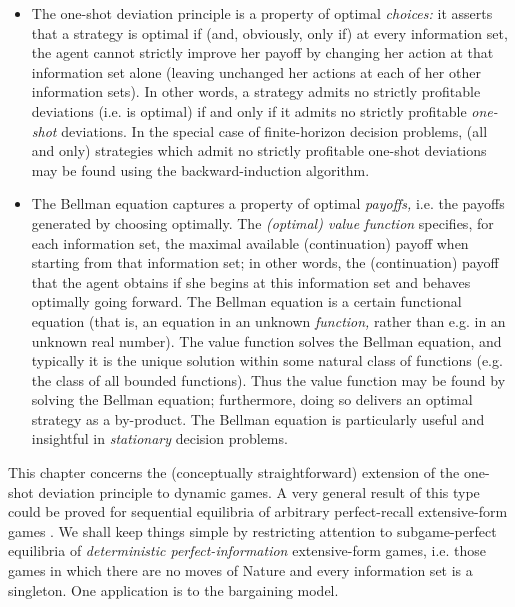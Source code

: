 \begin{itemize}

	\item The one-shot deviation principle is a property of optimal \emph{choices:} it asserts that a strategy is optimal if (and, obviously, only if) at every information set, the agent cannot strictly improve her payoff by changing her action at that information set alone (leaving unchanged her actions at each of her other information sets). In other words, a strategy admits no strictly profitable deviations (i.e. is optimal) if and only if it admits no strictly profitable \emph{one-shot} deviations. In the special case of finite-horizon decision problems, (all and only) strategies which admit no strictly profitable one-shot deviations may be found using the backward-induction algorithm.

	\item The Bellman equation captures a property of optimal \emph{payoffs,} i.e. the payoffs generated by choosing optimally. The \emph{(optimal) value function} specifies, for each information set, the maximal available (continuation) payoff when starting from that information set; in other words, the (continuation) payoff that the agent obtains if she begins at this information set and behaves optimally going forward. The Bellman equation is a certain functional equation (that is, an equation in an unknown \emph{function,} rather than e.g. in an unknown real number). The value function solves the Bellman equation, and typically it is the unique solution within some natural class of functions (e.g. the class of all bounded functions). Thus the value function may be found by solving the Bellman equation; furthermore, doing so delivers an optimal strategy as a by-product. The Bellman equation is particularly useful and insightful in \emph{stationary} decision problems.

\end{itemize}

This chapter concerns the (conceptually straightforward) extension of the one-shot deviation principle to dynamic games. A very general result of this type could be proved for sequential equilibria of arbitrary perfect-recall extensive-form games \parencite[see e.g.][Exercise~227.1]{OsborneRubinstein1994}. We shall keep things simple by restricting attention to subgame-perfect equilibria of \emph{deterministic perfect-information} extensive-form games, i.e. those games in which there are no moves of Nature and every information set is a singleton. One application is to the \textcite{Rubinstein1982} bargaining model.

